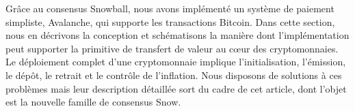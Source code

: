 \documentclass[letterpaper,twocolumn,10pt]{article}
\theoremstyle{definition}
\begin{document}
Grâce au consensus Snowball, nous avons implémenté un système de paiement simpliste, Avalanche, qui supporte les transactions Bitcoin. Dans cette section, nous en décrivons la conception et schématisons la manière dont l'implémentation peut supporter la primitive de transfert de valeur au cœur des cryptomonnaies.
Le déploiement complet d'une cryptomonnaie implique l'initialisation, l'émission, le dépôt, le retrait et le contrôle de l'inflation. Nous disposons de solutions à ces problèmes mais leur description détaillée sort du cadre de cet article, dont l'objet est la nouvelle famille de consensus Snow. %
\end{document}
